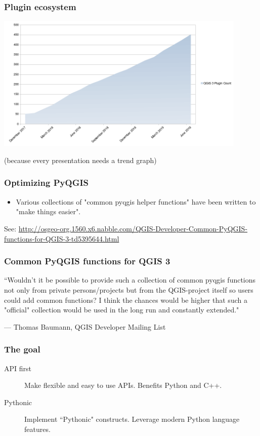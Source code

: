\begin{frame}
\frametitle{Plugin ecosystem}
	\includegraphics[width=0.9\textwidth]{img/qgis_plugin_count.png}

	(because every presentation needs a trend graph)
\end{frame}

\begin{frame}
\frametitle{Optimizing PyQGIS}

\begin{itemize}
	\item Various collections of "common pyqgis helper functions" have been written to "make things easier".
\end{itemize}

See: \url{http://osgeo-org.1560.x6.nabble.com/QGIS-Developer-Common-PyQGIS-functions-for-QGIS-3-td5395644.html}
\end{frame}

\begin{frame}
\frametitle{Common PyQGIS functions for QGIS 3}
\epigraph{``Wouldn't it be possible to provide such a collection of common pyqgis functions not only from private persons/projects but from the QGIS-project itself so users could add common functions?
I think the chances would be higher that such a "official" collection would be used in the long run and constantly extended."}{--- Thomas Baumann, QGIS Developer Mailing List}
\end{frame}

\begin{frame}
\frametitle{The goal}
\begin{description}
	\item [API first] Make flexible and easy to use APIs. Benefits Python and C++.
	\item [Pythonic] Implement ``Pythonic" constructs. Leverage modern Python language features.
\end{description}
\end{frame}